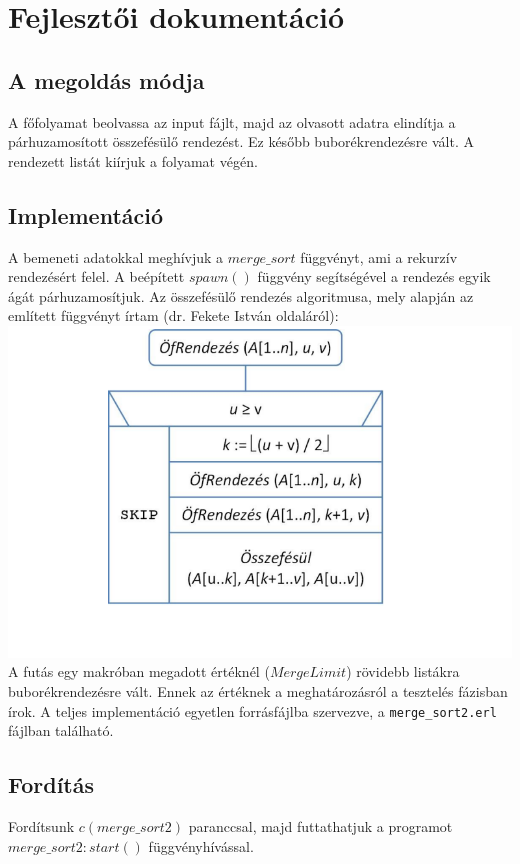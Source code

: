 \documentclass{article}
\begin{document}
	\section{Fejlesztői dokumentáció}
	
	\subsection{A megoldás módja}
	A főfolyamat beolvassa az input fájlt, majd az olvasott adatra elindítja a párhuzamosított összefésülő rendezést. Ez később buborékrendezésre vált. A rendezett listát kiírjuk a folyamat végén. 
	
	\subsection{Implementáció}
	 A bemeneti adatokkal meghívjuk a \(merge\_sort\) függvényt, ami a rekurzív rendezésért felel. A beépített \(spawn()\) függvény segítségével a rendezés egyik ágát párhuzamosítjuk. Az összefésülő rendezés algoritmusa, mely alapján az említett függvényt írtam (dr. Fekete István oldaláról):\hfill \break
	 \includegraphics[scale=0.6]{mergeSort}
	 A futás egy makróban megadott értéknél (\(MergeLimit\)) rövidebb listákra buborékrendezésre vált. Ennek az értéknek a meghatározásról a tesztelés fázisban írok. A teljes implementáció egyetlen forrásfájlba szervezve, a \texttt{merge\_sort2.erl} fájlban található.
	
	\subsection{Fordítás}
	Fordítsunk \(c(merge\_sort2)\) paranccsal, majd futtathatjuk a programot \(merge\_sort2:start()\) függvényhívással.
	
\end{document}
